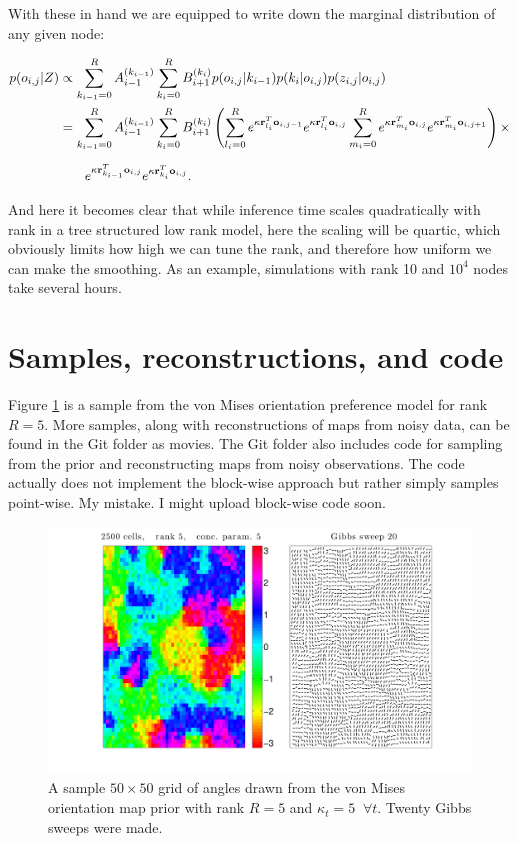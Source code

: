 \documentclass[11pt]{article}
\begin{document}
\noindent With these in hand we are equipped to write down the marginal distribution of any given node:

\begin{align}
p(o_{i,j}|Z) &\propto \sum_{k_{i-1}=0}^R A_{i-1}^{(k_{i-1})} \sum_{k_i=0}^R B_{i+1}^{(k_{i})} p(o_{i,j}|k_{i-1}) p(k_i|o_{i,j}) p(z_{i,j}|o_{i,j}) \notag \\
&= \sum_{k_{i-1}=0}^R A_{i-1}^{(k_{i-1})} \sum_{k_i=0}^R B_{i+1}^{(k_{i})} \left( \sum_{l_i=0}^R e^{\kappa\mathbf{r}_{l_i}^T\mathbf{o}_{i,j-1}} e^{\kappa\mathbf{r}_{l_i}^T\mathbf{o}_{i,j}} \sum_{m_i=0}^R e^{\kappa\mathbf{r}_{m_i}^T\mathbf{o}_{i,j}} e^{\kappa\mathbf{r}_{m_i}^T\mathbf{o}_{i,j+1}}\right) \times \\[2mm]
&\;\;\;\;\;\;\;e^{\kappa \mathbf{r}_{k_{i-1}}^T \mathbf{o}_{i,j}} e^{\kappa \mathbf{r}_{k_i}^T \mathbf{o}_{i,j}}. \notag
\end{align}

\noindent And here it becomes clear that while inference time scales quadratically with rank in a tree structured low rank model, here the scaling will be quartic, which obviously limits how high we can tune the rank, and therefore how uniform we can make the smoothing. As an example, simulations with rank 10 and $10^4$ nodes take several hours.

\section{Samples, reconstructions, and code}
\label{sec:samples_and_reconstructions}

Figure \ref{fig:sample_1} is a sample from the von Mises orientation preference model for rank $R=5$. More samples, along with reconstructions of maps from noisy data, can be found in the Git folder as movies. The Git folder also includes code for sampling from the prior and reconstructing maps from noisy observations. The code actually does not implement the block-wise approach but rather simply samples point-wise. My mistake. I might upload block-wise code soon.

\begin{figure}[h]
\centering
\includegraphics[scale=0.5]{../fig/sample__N_1024__R_5__kq_5__ky_5__nG_20}
\caption{A sample $50\times50$ grid of angles drawn from the von Mises orientation map prior with rank $R=5$ and $\kappa_t=5\;\;\forall t$. Twenty Gibbs sweeps were made.}
\label{fig:sample_1}
\end{figure}



\end{document}
